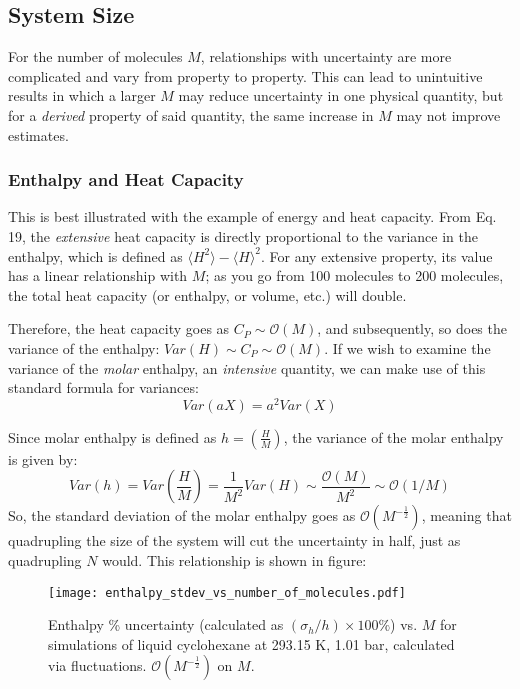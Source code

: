 \documentclass[aps,pre,twocolumn,nofootinbib,superscriptaddress,linenumbers,10pt, draft,tightenlines]{revtex4-1}
\begin{document}
\subsection{System Size}
For the number of molecules $M$, relationships with uncertainty are more complicated and vary from property to property.   This can lead to unintuitive results in which a larger $M$ may reduce uncertainty in one physical quantity, but for a \emph{derived} property of said quantity, the same increase in $M$ may not improve estimates.

\subsubsection{Enthalpy and Heat Capacity}
This is best illustrated with the example of energy and heat capacity.  From Eq. 19, %
the \emph{extensive} heat capacity is directly proportional to the variance in the enthalpy, which is defined as $\langle H^2 \rangle - \langle H \rangle^2$.  For any extensive property, its value has a linear relationship with $M$; as you go from 100 molecules to 200 molecules, the total heat capacity (or enthalpy, or volume, etc.) will double.

Therefore, the heat capacity goes as $C_P \sim \mathcal{O}(M)$, and subsequently, so does the variance of the enthalpy: $ Var(H) \sim C_P \sim \mathcal{O}(M) $.  If we wish to examine the variance of the \emph{molar} enthalpy, an \emph{intensive} quantity, we can make use of this standard formula for variances:
\begin{equation}
Var(aX)=a^2Var(X)
\end{equation}

Since molar enthalpy is defined as $h=\left(\frac{H}{M}\right)$, the variance of the molar enthalpy is given by:
\begin{equation}
Var(h) = Var\left(\frac{H}{M}\right) = \frac{1}{M^2} Var(H) \sim \frac{\mathcal{O}(M)}{M^2} \sim \mathcal{O} (1/M)
\end{equation}
So, the standard deviation of the molar enthalpy goes as $\mathcal{O} (M^{-\frac{1}{2}})$, meaning that quadrupling the size of the system will cut the uncertainty in half, just as quadrupling $N$ would.  This relationship is shown in figure:

\begin{figure}[H]
\texttt{[image: enthalpy\_stdev\_vs\_number\_of\_molecules.pdf]}
\caption{Enthalpy \% uncertainty (calculated as $(\sigma_{h}/h) \times 100 \%$) vs. $M$ for simulations of liquid cyclohexane at 293.15 K, 1.01 bar, calculated via fluctuations. $\mathcal{O} (M^{-\frac{1}{2}})$ on $M$.}
\end{figure}
\end{document}
